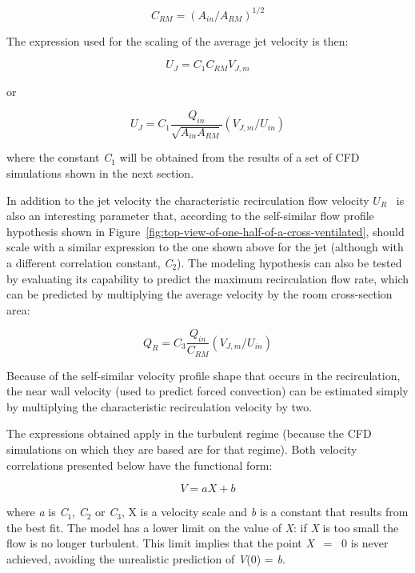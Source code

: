 \begin{equation}
{C_{RM}} = {\left( {{A_{in}}/{A_{RM}}} \right)^{1/2}}
\end{equation}

The expression used for the scaling of the average jet velocity is then:

\begin{equation}
{U_J} = {C_1}{C_{RM}}{V_{J,m}}
\end{equation}

or

\begin{equation}
{U_J} = {C_1}\frac{{{Q_{in}}}}{{\sqrt {{A_{in}}{A_{RM}}} }}\left( {{V_{J,m}}/{U_{in}}} \right)
\end{equation}

where the constant \emph{C}\(_{1}\) will be obtained from the results of a set of CFD simulations shown in the next section.

In addition to the jet velocity the characteristic recirculation flow velocity \({U_R}\) ~is also an interesting parameter that, according to the self-similar flow profile hypothesis shown in Figure~\ref{fig:top-view-of-one-half-of-a-cross-ventilated}, should scale with a similar expression to the one shown above for the jet (although with a different correlation constant, \emph{C}\(_{2}\)). The modeling hypothesis can also be tested by evaluating its capability to predict the maximum recirculation flow rate, which can be predicted by multiplying the average velocity by the room cross-section area:

\begin{equation}
{Q_R} = {C_3}\frac{{{Q_{in}}}}{{{C_{RM}}}}\left( {{V_{J,m}}/{U_{in}}} \right)
\end{equation}

Because of the self-similar velocity profile shape that occurs in the recirculation, the near wall velocity (used to predict forced convection) can be estimated simply by multiplying the characteristic recirculation velocity by two.

The expressions obtained apply in the turbulent regime (because the CFD simulations on which they are based are for that regime). Both velocity correlations presented below have the functional form:

\begin{equation}
V = aX + b
\end{equation}

where \emph{a} is \emph{C}\(_{1}\), \emph{C}\(_{2}\) or \emph{C}\(_{3}\), X is a velocity scale and \emph{b} is a constant that results from the best fit. The model has a lower limit on the value of \emph{X}: if \emph{X} is too small the flow is no longer turbulent. This limit implies that the point \emph{X}~ = ~0 is never achieved, avoiding the unrealistic prediction of \emph{V}(0) = \emph{b}.

